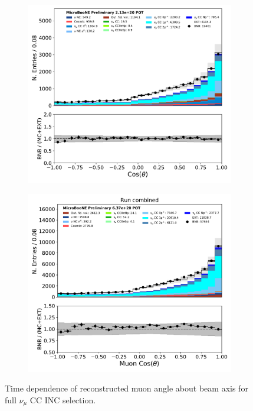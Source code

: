 \begin{figure}[hbt!]
\begin{center}
\begin{subfigure}[b]{0.35\textwidth}
    \end{subfigure}
    \begin{subfigure}[b]{0.35\textwidth}
        \centering
        \includegraphics[width=1.00\textwidth]{NuMuCCsel/Images/Ryan/Run3_nocrt/trk_cos_theta_08052020_fullsel_samples_event_category_noCRT.pdf}
    \end{subfigure} %
    \begin{subfigure}[b]{0.35\textwidth}
        \centering
        \includegraphics[width=1.00\textwidth]{NuMuCCsel/Images/Ryan/combined/trk_cos_theta_v_08052020_full_samples_longest_noCRT_event_category.pdf}
    \end{subfigure}
\caption{Time dependence of reconstructed muon angle about beam axis for full $\nu_{\mu}$ CC INC selection.}
\label{fig:NuMuCCsel:timedep:costheta}
\end{center}
\end{figure}

